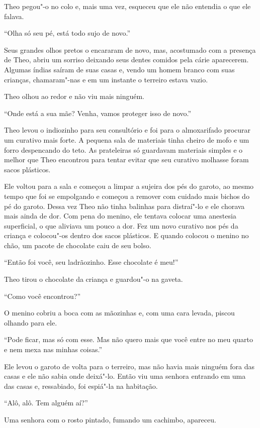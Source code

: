 Theo pegou"-o no colo e, mais uma vez, esqueceu que ele não entendia o
que ele falava.

``Olha só seu pé, está todo sujo de novo.''

Seus grandes olhos pretos o encararam de novo, mas, acostumado com a
presença de Theo, abriu um sorriso deixando seus dentes comidos pela
cárie aparecerem. Algumas índias saíram de suas casas e, vendo um homem
branco com suas crianças, chamaram"-nas e em um instante o terreiro
estava vazio.

Theo olhou ao redor e não viu mais ninguém.

``Onde está a sua mãe? Venha, vamos proteger isso de novo.''

Theo levou o indiozinho para seu consultório e foi para o almoxarifado
procurar um curativo mais forte. A pequena sala de materiais tinha
cheiro de mofo e um forro despencando do teto. As prateleiras só
guardavam materiais simples e o melhor que Theo encontrou para tentar
evitar que seu curativo molhasse foram sacos plásticos.

Ele voltou para a sala e começou a limpar a sujeira dos pés do garoto,
ao mesmo tempo que foi se empolgando e começou a remover com cuidado mais
bichos do pé do garoto. Dessa vez Theo não tinha balinhas para
distraí"-lo e ele chorava mais ainda de dor. Com pena do menino, ele
tentava colocar uma anestesia superficial, o que aliviava um pouco a dor.
Fez um novo curativo nos pés da criança e colocou"-os dentro
dos sacos plásticos. E quando colocou o menino no chão, um pacote de
chocolate caiu de seu bolso.

``Então foi você, seu ladrãozinho. Esse chocolate é meu!''

Theo tirou o chocolate da criança e guardou"-o na gaveta.

``Como você encontrou?''

O menino cobriu a boca com as mãozinhas e, com uma cara levada, piscou
olhando para ele.

``Pode ficar, mas só com esse. Mas não quero mais que você entre no meu
quarto e nem mexa nas minhas coisas.''

Ele levou o garoto de volta para o terreiro, mas não havia mais ninguém
fora das casas e ele não sabia onde deixá"-lo. Então viu uma senhora
entrando em uma das casas e, ressabiado, foi espiá"-la na habitação.

``Alô, alô. Tem alguém aí?''

Uma senhora com o rosto pintado, fumando um cachimbo, apareceu.

